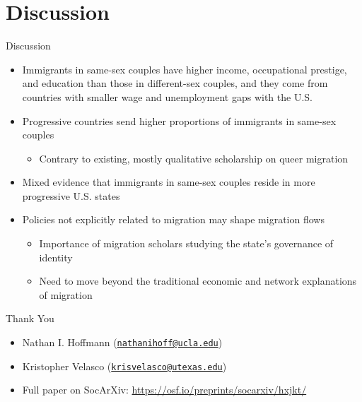 \documentclass[
  ignorenonframetext,
]{beamer}
\providecommand{\tightlist}{%
  \setlength{\itemsep}{0pt}\setlength{\parskip}{0pt}}
\begin{document}
\hypertarget{discussion}{%
\section{Discussion}\label{discussion}}

\begin{frame}{Discussion}
\protect\hypertarget{discussion-1}{}
\begin{itemize}
\tightlist
\item
  Immigrants in same-sex couples have higher income, occupational
  prestige, and education than those in different-sex couples, and they
  come from countries with smaller wage and unemployment gaps with the
  U.S.
\item
  Progressive countries send higher proportions of immigrants in
  same-sex couples

  \begin{itemize}
  \tightlist
  \item
    Contrary to existing, mostly qualitative scholarship on queer
    migration
  \end{itemize}
\item
  Mixed evidence that immigrants in same-sex couples reside in more
  progressive U.S. states
\item
  Policies not explicitly related to migration may shape migration flows

  \begin{itemize}
  \tightlist
  \item
    Importance of migration scholars studying the state's governance of
    identity
  \item
    Need to move beyond the traditional economic and network
    explanations of migration
  \end{itemize}
\end{itemize}
\end{frame}

\begin{frame}{}
\protect\hypertarget{section}{}
\begin{center}
  \huge{\textcolor{uclablue}{Thank You}}
\end{center}

\begin{itemize}
\tightlist
\item
  Nathan I. Hoffmann
  (\href{mailto:nathanihoff@ucla.edu}{\nolinkurl{nathanihoff@ucla.edu}})
\item
  Kristopher Velasco
  (\href{mailto:krisvelasco@utexas.edu}{\nolinkurl{krisvelasco@utexas.edu}})
\item
  Full paper on SocArXiv: \url{https://osf.io/preprints/socarxiv/hxjkt/}
\end{itemize}
\end{frame}
\end{document}
